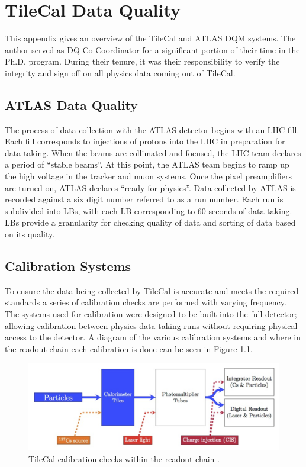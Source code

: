 \chapter{TileCal Data Quality}\label{app:Tile-DQ}
	This appendix gives an overview of the \gls{TileCal} and \gls{ATLAS} \gls{DQM} systems. The author served as \gls{DQ} Co-Coordinator for a significant portion of their time in the Ph.D. program. During their tenure, it was their responsibility to verify the integrity and sign off on all physics data coming out of \gls{TileCal}. 

	\section{ATLAS Data Quality}
		The process of data collection with the \gls{ATLAS} detector begins with an \gls{LHC} fill. Each fill corresponds to injections of protons into the \gls{LHC} in preparation for data taking. When the beams are collimated and focused, the \gls{LHC} team declares a period of ``stable beams''. At this point, the \gls{ATLAS} team begins to ramp up the high voltage in the tracker and muon systems. Once the pixel preamplifiers are turned on, \gls{ATLAS} declares ``ready for physics''. Data collected by \gls{ATLAS} is recorded against a six digit number referred to as a run number. Each run is subdivided into \glspl{LB}, with each \gls{LB} corresponding to 60 seconds of data taking. \glspl{LB} provide a granularity for checking quality of data and sorting of data based on its quality. 


	\section{Calibration Systems}
		To ensure the data being collected by \gls{TileCal} is accurate and meets the required standards a series of calibration checks are performed with varying frequency. The systems used for calibration were designed to be built into the full detector; allowing calibration between physics data taking runs without requiring physical access to the detector. A diagram of the various calibration systems and where in the readout chain each calibration is done can be seen in Figure \ref{fig:tile-calib-chain}.

		\begin{figure}
			\centering
			\includegraphics[width=.75\textwidth,keepaspectratio=true]{appendices/images/Tile_Calibration_Diagram.png}
			\caption{\label{fig:tile-calib-chain} \gls{TileCal} calibration checks within the readout chain \cite{ATLAS-tile}.}
		\end{figure}

